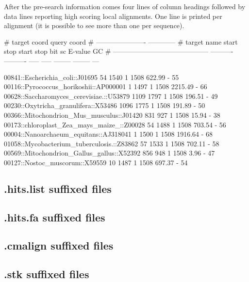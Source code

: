 After the pre-search information comes four lines of column headings
followed by data lines reporting high scoring local alignments. One
line is printed per alignment (it is possible to see more than one per
sequence).

\begin{sreoutputtiny}
#                                                       target coord   query coord                         
#                                             ----------------------  ------------                         
# target name                                      start        stop  start   stop    bit sc   E-value  GC%
# ------------------------------------------  ----------  ----------  -----  -----  --------  --------  ---

  00841::Escherichia_coli::J01695                     54        1540      1   1508    622.99         -   55
  00116::Pyrococcus_horikoshii::AP000001               1        1497      1   1508   2215.49         -   66
  00628::Saccharomyces_cerevisiae.::U53879          1109        1797      1   1508    196.51         -   49
  00230::Oxytricha_granulifera::X53486              1096        1775      1   1508    191.89         -   50
  00366::Mitochondrion_Mus_musculus::J01420          831         927      1   1508     15.94         -   38
  00173::chloroplast_Zea_mays_maize_::Z00028          54        1488      1   1508    703.54         -   56
  00004::Nanoarchaeum_equitans::AJ318041               1        1500      1   1508   1916.64         -   68
  01058::Mycobacterium_tuberculosis.::Z83862          57        1533      1   1508    702.11         -   58
  00569::Mitochondrion_Gallus_gallus::X52392         856         948      1   1508      3.96         -   47
  00127::Nostoc_muscorum::X59559                      10        1487      1   1508    697.37         -   54
\end{sreoutputtiny}

\subsection{.hits.list suffixed files}
\subsection{.hits.fa suffixed files}
\subsection{.cmalign suffixed files}
\subsection{.stk suffixed files}
